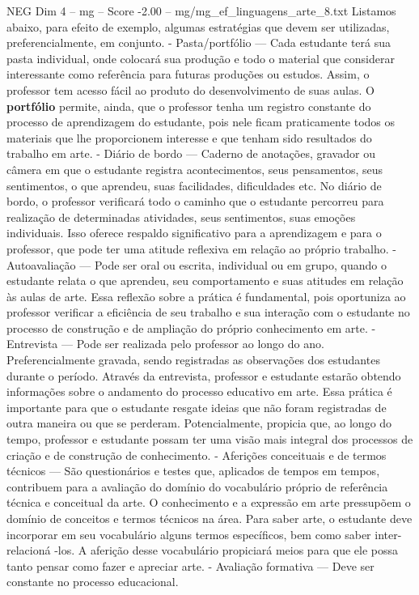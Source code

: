 \begin{textsample}{NEG Dim 4 – mg – Score -2.00 – mg/mg\_ef\_linguagens\_arte\_8.txt}
Listamos abaixo, para efeito de exemplo, algumas estratégias que devem ser utilizadas, preferencialmente, em conjunto. - Pasta/portfólio — Cada estudante terá sua pasta individual, onde colocará sua produção e todo o material que considerar interessante como referência para futuras produções ou estudos.
Assim, o professor tem acesso fácil ao produto do desenvolvimento de suas aulas.
O \textbf{portfólio} permite, ainda, que o professor tenha um registro constante do processo de aprendizagem do estudante, pois nele ficam praticamente todos os materiais que lhe proporcionem interesse e que tenham sido resultados do trabalho em arte. - Diário de bordo — Caderno de anotações, gravador ou câmera em que o estudante registra acontecimentos, seus pensamentos, seus sentimentos, o que aprendeu, suas facilidades, dificuldades etc.
No diário de bordo, o professor verificará todo o caminho que o estudante percorreu para realização de determinadas atividades, seus sentimentos, suas emoções individuais.
Isso oferece respaldo significativo para a aprendizagem e para o professor, que pode ter uma atitude reflexiva em relação ao próprio trabalho. - Autoavaliação — Pode ser oral ou escrita, individual ou em grupo, quando o estudante relata o que aprendeu, seu comportamento e suas atitudes em relação às aulas de arte.
Essa reflexão sobre a prática é fundamental, pois oportuniza ao professor verificar a eficiência de seu trabalho e sua interação com o estudante no processo de construção e de ampliação do próprio conhecimento em arte. - Entrevista — Pode ser realizada pelo professor ao longo do ano.
Preferencialmente gravada, sendo registradas as observações dos estudantes durante o período.
Através da entrevista, professor e estudante estarão obtendo informações sobre o andamento do processo educativo em arte.
Essa prática é importante para que o estudante resgate ideias que não foram registradas de outra maneira ou que se perderam.
Potencialmente, propicia que, ao longo do tempo, professor e estudante possam ter uma visão mais integral dos processos de criação e de construção de conhecimento. - Aferições conceituais e de termos técnicos — São questionários e testes que, aplicados de tempos em tempos, contribuem para a avaliação do domínio do vocabulário próprio de referência técnica e conceitual da arte.
O conhecimento e a expressão em arte pressupõem o domínio de conceitos e termos técnicos na área.
Para saber arte, o estudante deve incorporar em seu vocabulário alguns termos específicos, bem como saber inter-relacioná -los.
A aferição desse vocabulário propiciará meios para que ele possa tanto pensar como fazer e apreciar arte. - Avaliação formativa — Deve ser constante no processo educacional.

\end{textsample}
